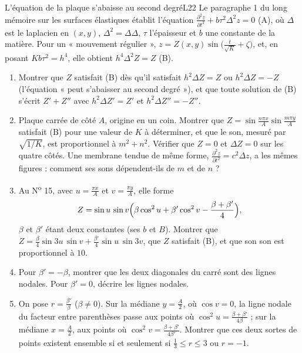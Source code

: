 \documentclass[11pt,a4paper]{article}
\begin{document}
\begin{exercice}{L'équation de la plaque s'abaisse au second degré}{L2}{2}
Le paragraphe 1 du long mémoire sur les surfaces élastiques établit l'équation
$\frac{\partial^2z}{\partial t^2} + b\tau^2\Delta^2z = 0$ (A), où $\Delta$ est le
laplacien en $(x,y)$, $\Delta^2 = \Delta\Delta$, $\tau$ l'épaisseur et $b$ une
constante de la matière. Pour un « mouvement régulier »,
$z = Z(x,y)\sin\bigl(\frac{t}{\sqrt K} + \zeta\bigr)$, et, en posant $Kb\tau^2 = h^4$,
elle obtient $h^4\Delta^2Z = Z$ (B).
\begin{enumerate}
\item Montrer que $Z$ satisfait (B) dès qu'il satisfait $h^2\Delta Z = Z$ ou
  $h^2\Delta Z = -Z$ (l'équation « peut s'abaisser au second degré »), et que toute
  solution de (B) s'écrit $Z' + Z''$ avec $h^2\Delta Z' = Z'$ et $h^2\Delta Z'' = -Z''$.
\item Plaque carrée de côté $A$, origine en un coin. Montrer que
  $Z = \sin\frac{n\pi x}{A}\sin\frac{m\pi y}{A}$ satisfait (B) pour une valeur de $K$ à
  déterminer, et que le son, mesuré par $\sqrt{1/K}$, est proportionnel à $m^2 + n^2$.
  Vérifier que $Z = 0$ et $\Delta Z = 0$ sur les quatre côtés. Une membrane tendue de
  même forme, $\frac{\partial^2z}{\partial t^2} = c^2\Delta z$, a les mêmes figures :
  comment ses sons dépendent-ils de $m$ et de $n$ ?
\item Au N\textsuperscript{o} 15, avec $u = \frac{\pi x}{A}$ et $v = \frac{\pi y}{A}$,
  elle forme
  \[
  Z = \sin u\,\sin v\Bigl(\beta\cos^2u + \beta'\cos^2v - \frac{\beta+\beta'}{4}\Bigr),
  \]
  $\beta$ et $\beta'$ étant deux constantes (ses $b$ et $B$). Montrer que
  $Z = \frac\beta4\sin3u\,\sin v + \frac{\beta'}{4}\sin u\,\sin3v$, que $Z$ satisfait
  (B), et que son son est proportionnel à $10$.
\item Pour $\beta' = -\beta$, montrer que les deux diagonales du carré sont des lignes
  nodales. Pour $\beta' = 0$, décrire les lignes nodales.
\item On pose $r = \frac{\beta'}{\beta}$ ($\beta \neq 0$). Sur la médiane
  $y = \frac A2$, où $\cos v = 0$, la ligne nodale du facteur entre parenthèses passe
  aux points où $\cos^2u = \frac{\beta+\beta'}{4\beta}$ ; sur la médiane
  $x = \frac A2$, aux points où $\cos^2v = \frac{\beta+\beta'}{4\beta'}$. Montrer que
  ces deux sortes de points existent ensemble si et seulement si
  $\frac13 \le r \le 3$ ou $r = -1$.
\end{enumerate}
\end{exercice}
\end{document}
